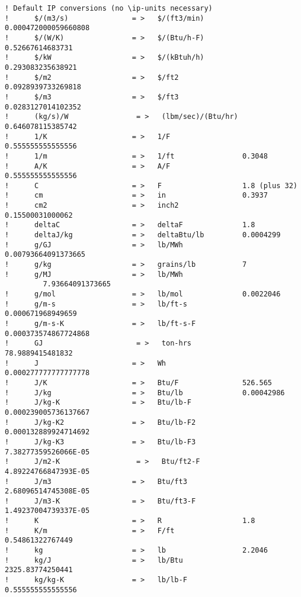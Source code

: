 \begin{lstlisting}
! Default IP conversions (no \ip-units necessary)
!      $/(m3/s)               = >   $/(ft3/min)         0.000472000059660808
!      $/(W/K)                = >   $/(Btu/h-F)         0.52667614683731
!      $/kW                   = >   $/(kBtuh/h)         0.293083235638921
!      $/m2                   = >   $/ft2               0.0928939733269818
!      $/m3                   = >   $/ft3               0.0283127014102352
!      (kg/s)/W                = >   (lbm/sec)/(Btu/hr)  0.646078115385742
!      1/K                    = >   1/F                 0.555555555555556
!      1/m                    = >   1/ft                0.3048
!      A/K                    = >   A/F                 0.555555555555556
!      C                      = >   F                   1.8 (plus 32)
!      cm                     = >   in                  0.3937
!      cm2                    = >   inch2               0.15500031000062
!      deltaC                 = >   deltaF              1.8
!      deltaJ/kg              = >   deltaBtu/lb         0.0004299
!      g/GJ                   = >   lb/MWh              0.00793664091373665
!      g/kg                   = >   grains/lb           7
!      g/MJ                   = >   lb/MWh              7.93664091373665
!      g/mol                  = >   lb/mol              0.0022046
!      g/m-s                  = >   lb/ft-s             0.000671968949659
!      g/m-s-K                = >   lb/ft-s-F           0.000373574867724868
!      GJ                      = >   ton-hrs             78.9889415481832
!      J                      = >   Wh                  0.000277777777777778
!      J/K                    = >   Btu/F               526.565
!      J/kg                   = >   Btu/lb              0.00042986
!      J/kg-K                 = >   Btu/lb-F            0.000239005736137667
!      J/kg-K2                = >   Btu/lb-F2           0.000132889924714692
!      J/kg-K3                = >   Btu/lb-F3           7.38277359526066E-05
!      J/m2-K                  = >   Btu/ft2-F           4.89224766847393E-05
!      J/m3                   = >   Btu/ft3             2.68096514745308E-05
!      J/m3-K                 = >   Btu/ft3-F           1.49237004739337E-05
!      K                      = >   R                   1.8
!      K/m                    = >   F/ft                0.54861322767449
!      kg                     = >   lb                  2.2046
!      kg/J                   = >   lb/Btu              2325.83774250441
!      kg/kg-K                = >   lb/lb-F             0.555555555555556

\end{lstlisting}
